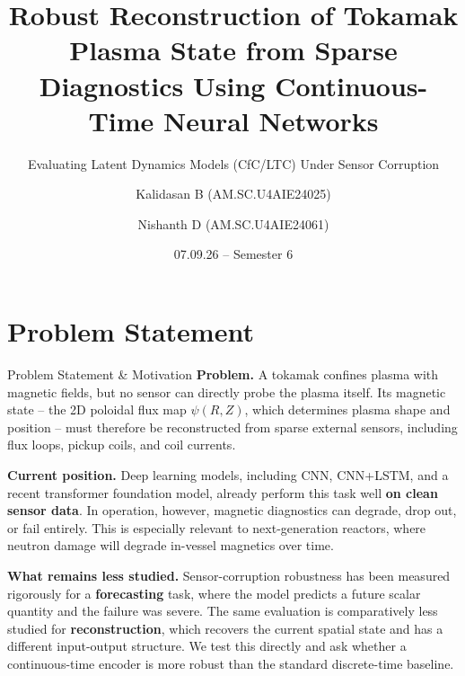\documentclass[aspectratio=169]{beamer}
\title[Robust Plasma Reconstruction via Continuous-Time Networks]{Robust Reconstruction of Tokamak Plasma State from Sparse Diagnostics Using Continuous-Time Neural Networks}
\subtitle{Evaluating Latent Dynamics Models (CfC/LTC) Under Sensor Corruption}
\author{Kalidasan B (AM.SC.U4AIE24025) \and Nishanth D (AM.SC.U4AIE24061)}
\institute{School of Computing, Amrita Vishwa Vidyapeetham \\ Supervisor: Dr Simi S, Team Number: 14 }
\date{ 07.09.26 -- Semester 6}
\begin{document}
\begin{frame}
  \titlepage
\end{frame}

\section{Problem Statement}
\begin{frame}{Problem Statement \& Motivation}
  \textbf{Problem.} A tokamak confines plasma with magnetic fields, but no
  sensor can directly probe the plasma itself. Its magnetic state -- the 2D
  poloidal flux map $\psi(R,Z)$, which determines plasma shape and position
  -- must therefore be reconstructed from sparse external sensors, including
  flux loops, pickup coils, and coil currents.
  \vspace{4pt}

  \textbf{Current position.} Deep learning models, including CNN, CNN+LSTM,
  and a recent transformer foundation model, already perform this task well
  \textbf{on clean sensor data}. In operation, however, magnetic diagnostics
  can degrade, drop out, or fail entirely. This is especially relevant to
  next-generation reactors, where neutron damage will degrade in-vessel
  magnetics over time.
  \vspace{4pt}

  \textbf{What remains less studied.} Sensor-corruption robustness has been
  measured rigorously for a \textbf{forecasting} task, where the model
  predicts a future scalar quantity and the failure was severe. The same
  evaluation is comparatively less studied for \textbf{reconstruction},
  which recovers the current spatial state and has a different input-output
  structure. We test this directly and ask whether a continuous-time encoder
  is more robust than the standard discrete-time baseline.
\end{frame}

\end{document}
